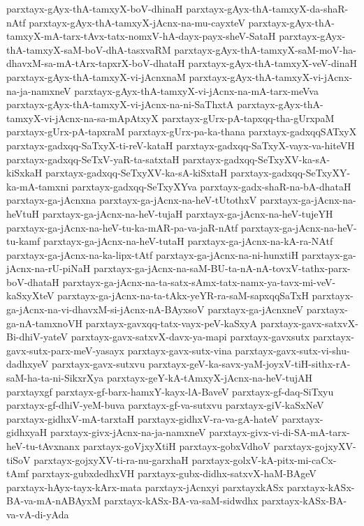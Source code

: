 {parxtayx-gAyx-thA-tamxyX-boV-dhinaH
parxtayx-gAyx-thA-tamxyX-da-shaR-nAtf
parxtayx-gAyx-thA-tamxyX-jAcnx-na-mu-cayxteV
parxtayx-gAyx-thA-tamxyX-mA-tarx-tAvx-tatx-nomxV-hA-dayx-payx-sheV-SataH
parxtayx-gAyx-thA-tamxyX-saM-boV-dhA-tasxvaRM
parxtayx-gAyx-thA-tamxyX-saM-moV-ha-dhavxM-sa-mA-tArx-tapxrX-boV-dhataH
parxtayx-gAyx-thA-tamxyX-veV-dinaH
parxtayx-gAyx-thA-tamxyX-vi-jAcnxnaM
parxtayx-gAyx-thA-tamxyX-vi-jAcnx-na-ja-namxneV
parxtayx-gAyx-thA-tamxyX-vi-jAcnx-na-mA-tarx-meVva
parxtayx-gAyx-thA-tamxyX-vi-jAcnx-na-ni-SaThxtA
parxtayx-gAyx-thA-tamxyX-vi-jAcnx-na-sa-mApAtxyX
parxtayx-gUrx-pA-tapxqq-tha-gUrxpaM
parxtayx-gUrx-pA-tapxraM
parxtayx-gUrx-pa-ka-thana
parxtayx-gadxqqSATxyX
parxtayx-gadxqq-SaTxyX-ti-reV-kataH
parxtayx-gadxqq-SaTxyX-vayx-va-hiteVH
parxtayx-gadxqq-SeTxV-yaR-ta-satxtaH
parxtayx-gadxqq-SeTxyXV-ka-sA-kiSxkaH
parxtayx-gadxqq-SeTxyXV-ka-sA-kiSxtaH
parxtayx-gadxqq-SeTxyXY-ka-mA-tamxni
parxtayx-gadxqq-SeTxyXYva
parxtayx-gadx-shaR-na-bA-dhataH
parxtayx-ga-jAcnxna
parxtayx-ga-jAcnx-na-heV-tUtothxV
parxtayx-ga-jAcnx-na-heVtuH
parxtayx-ga-jAcnx-na-heV-tujaH
parxtayx-ga-jAcnx-na-heV-tujeYH
parxtayx-ga-jAcnx-na-heV-tu-ka-mAR-pa-va-jaR-nAtf
parxtayx-ga-jAcnx-na-heV-tu-kamf
parxtayx-ga-jAcnx-na-heV-tutaH
parxtayx-ga-jAcnx-na-kA-ra-NAtf
parxtayx-ga-jAcnx-na-ka-lipx-tAtf
parxtayx-ga-jAcnx-na-ni-hunxtiH
parxtayx-ga-jAcnx-na-rU-piNaH
parxtayx-ga-jAcnx-na-saM-BU-ta-nA-nA-tovxV-tathx-parx-boV-dhataH
parxtayx-ga-jAcnx-na-ta-satx-sAmx-tatx-namx-ya-tavx-mi-veV-kaSxyXteV
parxtayx-ga-jAcnx-na-ta-tAkx-yeYR-ra-saM-sapxqqSaTxH
parxtayx-ga-jAcnx-na-vi-dhavxM-si-jAcnx-nA-BAyxsoV
parxtayx-ga-jAcnxneV
parxtayx-ga-nA-tamxnoVH
parxtayx-gavxqq-tatx-vayx-peV-kaSxyA
parxtayx-gavx-satxvX-Bi-dhiV-yateV
parxtayx-gavx-satxvX-davx-ya-mapi
parxtayx-gavxsutx
parxtayx-gavx-sutx-parx-meV-yasayx
parxtayx-gavx-sutx-vina
parxtayx-gavx-sutx-vi-shu-dadhxyeV
parxtayx-gavx-sutxvu
parxtayx-geV-ka-savx-yaM-joyxV-tiH-sithx-rA-saM-ha-ta-ni-SikxrXya
parxtayx-geY-kA-tAmxyX-jAcnx-na-heV-tujAH
parxtayxgf
parxtayx-gf-barx-hamxY-kayx-lA-BaveV
parxtayx-gf-daq-SiTxyu
parxtayx-gf-dhiV-yeM-buva
parxtayx-gf-va-sutxvu
parxtayx-giV-kaSxNeV
parxtayx-gidhxV-mA-tarxtaH
parxtayx-gidhxV-ra-va-gA-hateV
parxtayx-gidhxyaH
parxtayx-givx-jAcnx-na-ja-namxneV
parxtayx-givx-vi-di-SA-mA-tarx-heV-tu-tAvxnanx
parxtayx-goVjxyXtiH
parxtayx-gobxVdhoV
parxtayx-gojxyXV-tiSoV
parxtayx-gojxyXV-ti-ra-nu-garxhaH
parxtayx-golxV-kA-pitx-mi-caCx-tAmf
parxtayx-gubxdedhxVH
parxtayx-gubx-didhx-satxvX-haM-BAgeV
parxtayx-hAyx-tayx-kArx-mata
parxtayx-jAcnxyi
parxtayxkASx
parxtayx-kASx-BA-va-mA-nABAyxM
parxtayx-kASx-BA-va-saM-sidwdhx
parxtayx-kASx-BA-va-vA-di-yAda
}
